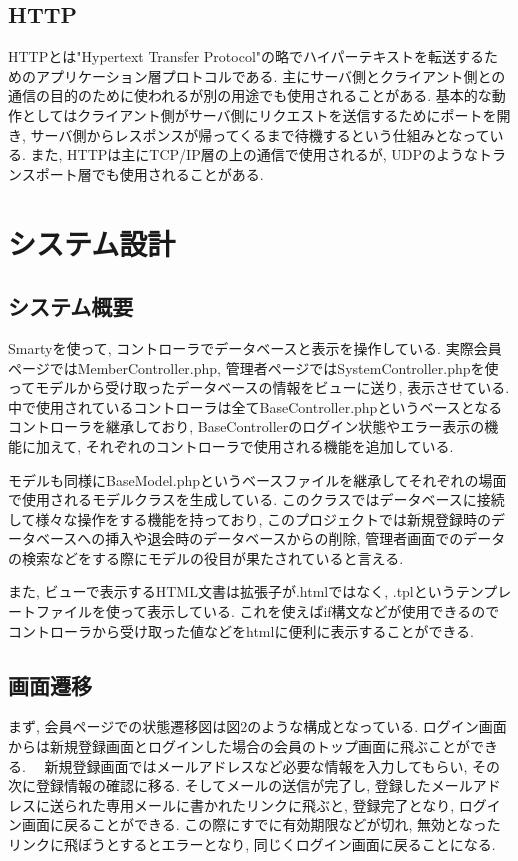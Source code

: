 \documentclass[submit,techrep]{ipsj}
\begin{document}
\subsection{HTTP}
HTTPとは"Hypertext Transfer Protocol"の略でハイパーテキストを転送するためのアプリケーション層プロトコルである. 
主にサーバ側とクライアント側との通信の目的のために使われるが別の用途でも使用されることがある. 基本的な動作としてはクライアント側がサーバ側にリクエストを送信するためにポートを開き, サーバ側からレスポンスが帰ってくるまで待機するという仕組みとなっている. 
また, HTTPは主にTCP/IP層の上の通信で使用されるが, UDPのようなトランスポート層でも使用されることがある. 

\section{システム設計}
\subsection{システム概要}
Smartyを使って, コントローラでデータベースと表示を操作している. 実際会員ページではMemberController.php, 管理者ページではSystemController.phpを使ってモデルから受け取ったデータベースの情報をビューに送り, 表示させている.  
中で使用されているコントローラは全てBaseController.phpというベースとなるコントローラを継承しており, BaseControllerのログイン状態やエラー表示の機能に加えて, それぞれのコントローラで使用される機能を追加している. 

モデルも同様にBaseModel.phpというベースファイルを継承してそれぞれの場面で使用されるモデルクラスを生成している. 
このクラスではデータベースに接続して様々な操作をする機能を持っており, このプロジェクトでは新規登録時のデータベースへの挿入や退会時のデータベースからの削除, 管理者画面でのデータの検索などをする際にモデルの役目が果たされていると言える. 

また, ビューで表示するHTML文書は拡張子が.htmlではなく, .tplというテンプレートファイルを使って表示している. これを使えばif構文などが使用できるのでコントローラから受け取った値などをhtmlに便利に表示することができる. 

\subsection{画面遷移}
まず,  会員ページでの状態遷移図は図2のような構成となっている.  ログイン画面からは新規登録画面とログインした場合の会員のトップ画面に飛ぶことができる.　
新規登録画面ではメールアドレスなど必要な情報を入力してもらい, その次に登録情報の確認に移る. そしてメールの送信が完了し, 登録したメールアドレスに送られた専用メールに書かれたリンクに飛ぶと, 登録完了となり, ログイン画面に戻ることができる. 
この際にすでに有効期限などが切れ, 無効となったリンクに飛ぼうとするとエラーとなり, 同じくログイン画面に戻ることになる. 
\end{document}

